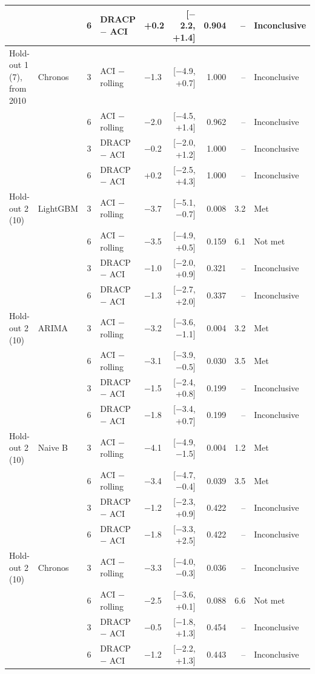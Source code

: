 \begin{tabular}{llcllrrrl}
 &  & 6 & DRACP $-$ ACI & +0.2 & [$-$2.2, +1.4] & 0.904 & -- & Inconclusive \\
\midrule
Hold-out 1 (7), from 2010 & Chronos & 3 & ACI $-$ rolling & $-$1.3 & [$-$4.9, +0.7] & 1.000 & -- & Inconclusive \\
 &  & 6 & ACI $-$ rolling & $-$2.0 & [$-$4.5, +1.4] & 0.962 & -- & Inconclusive \\
 &  & 3 & DRACP $-$ ACI & $-$0.2 & [$-$2.0, +1.2] & 1.000 & -- & Inconclusive \\
 &  & 6 & DRACP $-$ ACI & +0.2 & [$-$2.5, +4.3] & 1.000 & -- & Inconclusive \\
\midrule
Hold-out 2 (10) & LightGBM & 3 & ACI $-$ rolling & $-$3.7 & [$-$5.1, $-$0.7] & 0.008 & 3.2 & Met \\
 &  & 6 & ACI $-$ rolling & $-$3.5 & [$-$4.9, +0.5] & 0.159 & 6.1 & Not met \\
 &  & 3 & DRACP $-$ ACI & $-$1.0 & [$-$2.0, +0.9] & 0.321 & -- & Inconclusive \\
 &  & 6 & DRACP $-$ ACI & $-$1.3 & [$-$2.7, +2.0] & 0.337 & -- & Inconclusive \\
\midrule
Hold-out 2 (10) & ARIMA & 3 & ACI $-$ rolling & $-$3.2 & [$-$3.6, $-$1.1] & 0.004 & 3.2 & Met \\
 &  & 6 & ACI $-$ rolling & $-$3.1 & [$-$3.9, $-$0.5] & 0.030 & 3.5 & Met \\
 &  & 3 & DRACP $-$ ACI & $-$1.5 & [$-$2.4, +0.8] & 0.199 & -- & Inconclusive \\
 &  & 6 & DRACP $-$ ACI & $-$1.8 & [$-$3.4, +0.7] & 0.199 & -- & Inconclusive \\
\midrule
Hold-out 2 (10) & Naive B & 3 & ACI $-$ rolling & $-$4.1 & [$-$4.9, $-$1.5] & 0.004 & 1.2 & Met \\
 &  & 6 & ACI $-$ rolling & $-$3.4 & [$-$4.7, $-$0.4] & 0.039 & 3.5 & Met \\
 &  & 3 & DRACP $-$ ACI & $-$1.2 & [$-$2.3, +0.9] & 0.422 & -- & Inconclusive \\
 &  & 6 & DRACP $-$ ACI & $-$1.8 & [$-$3.3, +2.5] & 0.422 & -- & Inconclusive \\
\midrule
Hold-out 2 (10) & Chronos & 3 & ACI $-$ rolling & $-$3.3 & [$-$4.0, $-$0.3] & 0.036 & -- & Inconclusive \\
 &  & 6 & ACI $-$ rolling & $-$2.5 & [$-$3.6, +0.1] & 0.088 & 6.6 & Not met \\
 &  & 3 & DRACP $-$ ACI & $-$0.5 & [$-$1.8, +1.3] & 0.454 & -- & Inconclusive \\
 &  & 6 & DRACP $-$ ACI & $-$1.2 & [$-$2.2, +1.3] & 0.443 & -- & Inconclusive \\
\bottomrule
\end{tabular}
